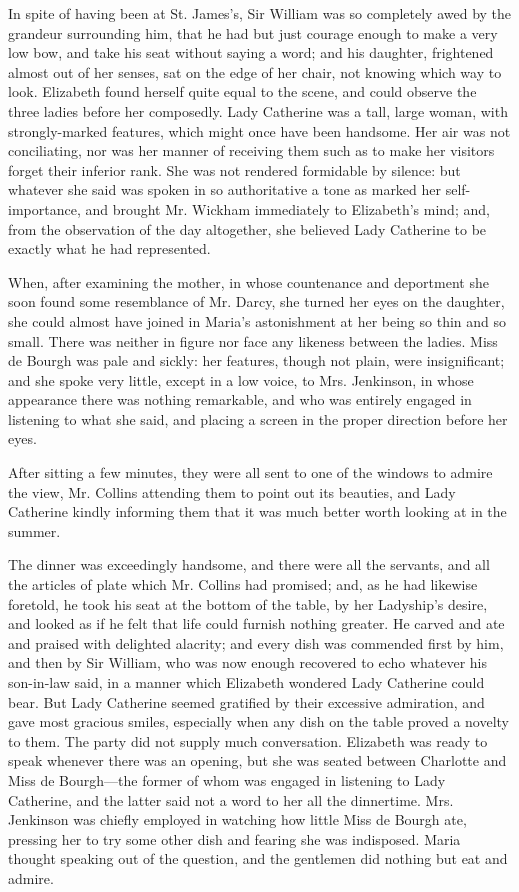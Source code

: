 In spite of having been at St. James's, Sir William was so completely awed by the grandeur surrounding him, that he had but just courage enough to make a very low bow, and take his seat without saying a word; and his daughter, frightened almost out of her senses, sat on the edge of her chair, not knowing which way to look. Elizabeth found herself quite equal to the scene, and could observe the three ladies before her composedly. Lady Catherine was a tall, large woman, with strongly-marked features, which might once have been handsome. Her air was not conciliating, nor was her manner of receiving them such as to make her visitors forget their inferior rank. She was not rendered formidable by silence: but whatever she said was spoken in so authoritative a tone as marked her self-importance, and brought Mr. Wickham immediately to Elizabeth's mind; and, from the observation of the day altogether, she believed Lady Catherine to be exactly what he had represented.

When, after examining the mother, in whose countenance and deportment she soon found some resemblance of Mr. Darcy, she turned her eyes on the daughter, she could almost have joined in Maria's astonishment at her being so thin and so small. There was neither in figure nor face any likeness between the ladies. Miss de Bourgh was pale and sickly: her features, though not plain, were insignificant; and she spoke very little, except in a low voice, to Mrs. Jenkinson, in whose appearance there was nothing remarkable, and who was entirely engaged in listening to what she said, and placing a screen in the proper direction before her eyes.

After sitting a few minutes, they were all sent to one of the windows to admire the view, Mr. Collins attending them to point out its beauties, and Lady Catherine kindly informing them that it was much better worth looking at in the summer.

The dinner was exceedingly handsome, and there were all the servants, and all the articles of plate which Mr. Collins had promised; and, as he had likewise foretold, he took his seat at the bottom of the table, by her Ladyship's desire, and looked as if he felt that life could furnish nothing greater. He carved and ate and praised with delighted alacrity; and every dish was commended first by him, and then by Sir William, who was now enough recovered to echo whatever his son-in-law said, in a manner which Elizabeth wondered Lady Catherine could bear. But Lady Catherine seemed gratified by their excessive admiration, and gave most gracious smiles, especially when any dish on the table proved a novelty to them. The party did not supply much conversation. Elizabeth was ready to speak whenever there was an opening, but she was seated between Charlotte and Miss de Bourgh---the former of whom was engaged in listening to Lady Catherine, and the latter said not a word to her all the dinnertime. Mrs. Jenkinson was chiefly employed in watching how little Miss de Bourgh ate, pressing her to try some other dish and fearing she was indisposed. Maria thought speaking out of the question, and the gentlemen did nothing but eat and admire.

